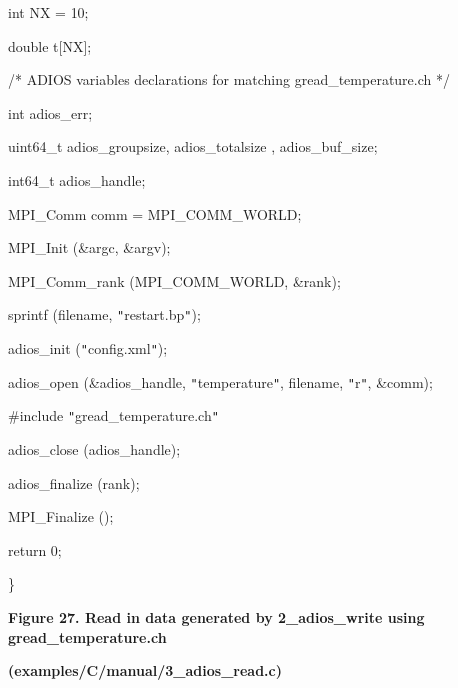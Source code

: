 \vspace{10pt}
int              NX\textbf{ }=\textbf{ }10;

\vspace{10pt}
double      t[NX];

\vspace{22pt}
/* ADIOS variables declarations for matching gread\_temperature.ch */

\vspace{10pt}
int                  adios\_err;

\vspace{10pt}
uint64\_t       adios\_groupsize, adios\_totalsize{\color{color02} , adios\_buf\_size};

\vspace{10pt}
int64\_t          adios\_handle;

\vspace{10pt}
MPI\_Comm  comm =  MPI\_COMM\_WORLD;

\vspace{22pt}
MPI\_Init (\&argc, \&argv);

\vspace{10pt}
MPI\_Comm\_rank (MPI\_COMM\_WORLD, \&rank);

\vspace{10pt}
sprintf (filename, \texttt{"}restart.bp\texttt{"});

\vspace{10pt}
adios\_init (\texttt{"}config.xml\texttt{"});

\vspace{10pt}
adios\_open (\&adios\_handle, \texttt{"}temperature\texttt{"}, filename, {\color{color02} \texttt{"}r\texttt{"}}, 
\&comm);

\vspace{10pt}
{\color{color02} \#include \texttt{"}gread\_temperature.ch\texttt{"}}

\vspace{10pt}
adios\_close (adios\_handle);

\vspace{10pt}
adios\_finalize (rank);

\vspace{10pt}
MPI\_Finalize ();

\vspace{10pt}
return 0;

\vspace{10pt}
\leftskip=0pt
\}

\label{HRef119580520}\label{HToc144350186}

\vspace{22pt}
\begin{center}
{\color{color20} \textbf{Figure 27. Read in data generated by 2\_adios\_write using 
gread\_temperature.ch}}

\vspace{10pt}
{\color{color20} \textbf{(examples/C/manual/3\_adios\_read.c)}}
\end{center}

